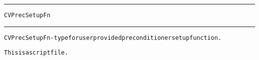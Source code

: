\begin{samepage}
\hrule
\begin{center}
{\large \verb!CVPrecSetupFn!}
\label{p:CVPrecSetupFn}
\end{center}
\hrule\vspace{0.1in}



\begin{alltt}
CVPrecSetupFn - type for user provided preconditioner setup function.
\end{alltt}

\end{samepage}



\begin{samepage}


\begin{alltt}
This is a script file. 
\end{alltt}

\end{samepage}




